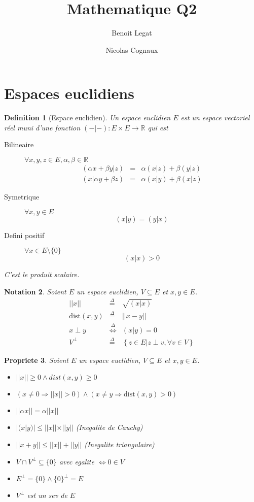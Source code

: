 \documentclass[11pt,a4paper]{article} %
\title{Mathematique Q2}
\author{Benoit Legat \and Nicolas Cognaux}
\newtheorem{defin}{Definition}[section]
\newtheorem{nota}[defin]{Notation}
\newtheorem{prop}[defin]{Propriete}
\begin{document}
\maketitle

\newcommand\dist{\mathrm{dist}}
\newcommand\Ker{\mathrm{Ker}}
\renewcommand\Im{\mathrm{Im}}

\section{Espaces euclidiens}
\begin{defin}[Espace euclidien]
	Un espace euclidien $E$ est un espace vectoriel réel muni d'une fonction
	$(-|-) : E \times E \to \mathbb{R}$ qui est
	\begin{description}
		\item[Bilineaire]
			$\forall x, y, z \in E, \alpha, \beta \in \mathbb{R}$
			\begin{eqnarray*}
				(\alpha x + \beta y | z) & = & \alpha (x | z) + \beta (y | z)\\
				(x | \alpha y + \beta z) & = & \alpha (x | y) + \beta (x | z)
			\end{eqnarray*}
		\item[Symetrique]
			$\forall x,y \in E$
			$$(x|y) = (y|x)$$
		\item[Defini positif]
			$\forall x \in E \setminus \{0\}$
			$$(x|x) > 0$$
	\end{description}
	C'est le produit scalaire.
\end{defin}

\begin{nota}
	Soient $E$ un espace euclidien, $V \subseteq E$ et $x,y \in E$.
	\begin{eqnarray*}
		||x|| & \stackrel{\Delta}{=} & \sqrt{(x|x)}\\
		\dist(x, y) & \stackrel{\Delta}{=} & ||x - y||\\
		x \perp y & \stackrel{\Delta}{\Leftrightarrow} & (x|y) = 0\\
		V^{\perp} & \stackrel{\Delta}{=} & \left\{z \in E | z \perp v, \forall v \in V\right\}
	\end{eqnarray*}
\end{nota}

\begin{prop}
	Soient $E$ un espace euclidien, $V \subseteq E$ et $x,y \in E$.
	\begin{itemize}
		\item $||x|| \geq 0 \land dist(x, y) \geq 0$
		\item $(x \neq 0 \Rightarrow ||x|| > 0) \land (x \neq y \Rightarrow \dist(x, y) > 0)$
		\item $||\alpha x|| = \alpha||x||$
		\item $|(x | y)| \leq ||x||\times||y||$ (Inegalite de Cauchy)
		\item $||x + y|| \leq ||x|| + ||y||$ (Inegalite triangulaire)
		\item $V \cap V^{\perp} \subseteq \{0\}$ avec egalite $\iff 0 \in V$
		\item $E^{\perp} = \{0\} \land \{0\}^{\perp} = E$
		\item $V^{\perp}$ est un sev de $E$
	\end{itemize}
\end{prop}
\end{document}
